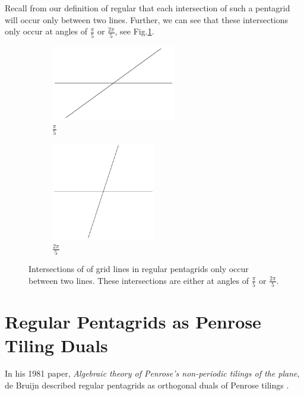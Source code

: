 \documentclass[
  oneside,
  11pt, a4paper,
  footinclude=true,
  headinclude=true,
  cleardoublepage=empty
]{scrbook}
\begin{document}
Recall from our definition of regular that each intersection of such a pentagrid will occur only between two lines. Further, we can see that these intersections only occur at angles of $\frac{\pi}{5}$ or $\frac{2\pi}{5}$, see Fig.\ref{fig:intersections}.

\begin{figure}[H]
\centering
\begin{subfigure}[b]{0.5\textwidth}
\centering
\includegraphics[width=0.6\textwidth]{Intersection1}
\caption{$\frac{\pi}{5}$}
\end{subfigure}\hfill
\begin{subfigure}[b]{0.5\textwidth}
\centering
\includegraphics[width=0.5\textwidth]{Intersection2}
\caption{$\frac{2\pi}{5}$}
\end{subfigure}

\caption[Two types of grid line intersections]{Intersections of of grid lines in regular pentagrids only occur between two lines. These intersections are either at angles of $\frac{\pi}{5}$ or $\frac{2\pi}{5}$. }
\label{fig:intersections}
\end{figure}


\section{Regular Pentagrids as Penrose Tiling Duals}
In his 1981 paper, \textit{Algebraic theory of Penrose's non-periodic tilings of the plane}, de Bruijn described regular pentagrids as orthogonal duals of Penrose tilings \cite{DeBruijn1981}.
\end{document}
